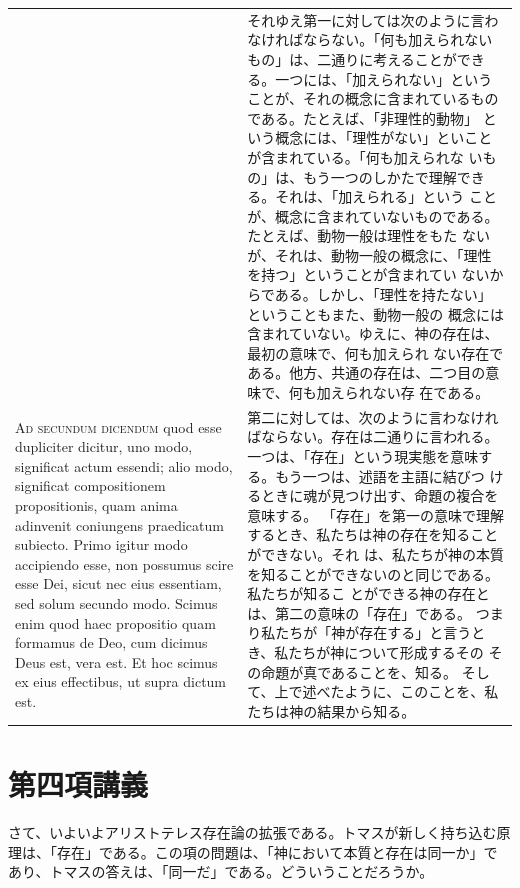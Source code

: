 \documentclass[paper=a4paper,fontsize=10pt,jafontsize=9pt,titlepage]{jlreq}
\begin{document}
\begin{longtable}{p{21em}p{21em}}
&

それゆえ第一に対しては次のように言わなければならない。「何も加えられない
 もの」は、二通りに考えることができる。一つには、「加えられない」という
 ことが、それの概念に含まれているものである。たとえば、「非理性的動物」
 という概念には、「理性がない」といことが含まれている。「何も加えられな
 いもの」は、もう一つのしかたで理解できる。それは、「加えられる」という
 ことが、概念に含まれていないものである。たとえば、動物一般は理性をもた
 ないが、それは、動物一般の概念に、「理性を持つ」ということが含まれてい
 ないからである。しかし、「理性を持たない」ということもまた、動物一般の
 概念には含まれていない。ゆえに、神の存在は、最初の意味で、何も加えられ
 ない存在である。他方、共通の存在は、二つ目の意味で、何も加えられない存
 在である。


\\

\textsc{Ad secundum dicendum} quod esse dupliciter dicitur, uno modo,
 significat actum essendi; alio modo, significat compositionem
 propositionis, quam anima adinvenit coniungens praedicatum subiecto.
Primo igitur modo accipiendo esse, non possumus scire esse Dei, sicut
 nec eius essentiam, sed solum secundo modo. Scimus enim quod haec
 propositio quam formamus de Deo, cum dicimus Deus est, vera est. Et hoc
 scimus ex eius effectibus, ut supra dictum est.


&

第二に対しては、次のように言わなければならない。存在は二通りに言われる。
 一つは、「存在」という現実態を意味する。もう一つは、述語を主語に結びつ
 けるときに魂が見つけ出す、命題の複合を意味する。
「存在」を第一の意味で理解するとき、私たちは神の存在を知ることができない。それ
 は、私たちが神の本質を知ることができないのと同じである。私たちが知るこ
 とができる神の存在とは、第二の意味の「存在」である。
つまり私たちが「神が存在する」と言うとき、私たちが神について形成するその
 その命題が真であることを、知る。
そして、上で述べたように、このことを、私たちは神の結果から知る。


\end{longtable}

\section{第四項講義}

さて、いよいよアリストテレス存在論の拡張である。トマスが新しく持ち込む原
理は、「存在」である。この項の問題は、「神において本質と存在は同一か」で
あり、トマスの答えは、「同一だ」である。どういうことだろうか。
\end{document}

